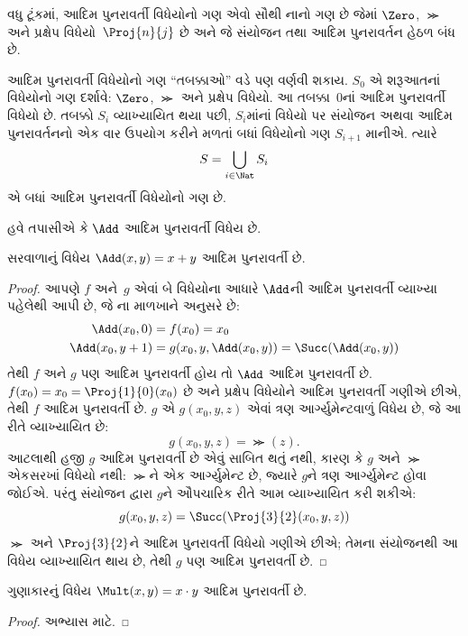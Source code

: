 \begin{explain}
વધુ ટૂંકમાં, આદિમ પુનરાવર્તી વિધેયોનો ગણ એવો સૌથી નાનો ગણ છે જેમાં
$\Zero$, $\Succ$ અને પ્રક્ષેપ વિધેયો~$\Proj{n}{j}$ છે અને જે
સંયોજન તથા આદિમ પુનરાવર્તન હેઠળ બંધ છે.

આદિમ પુનરાવર્તી વિધેયોનો ગણ ``તબક્કાઓ'' વડે પણ વર્ણવી શકાય. $S_0$
એ શરૂઆતનાં વિધેયોનો ગણ દર્શાવે: $\Zero$, $\Succ$ અને પ્રક્ષેપ
વિધેયો. આ તબક્કા~$0$નાં આદિમ પુનરાવર્તી વિધેયો છે. તબક્કો $S_i$
વ્યાખ્યાયિત થયા પછી, $S_i$માંનાં વિધેયો પર સંયોજન અથવા આદિમ
પુનરાવર્તનનો એક વાર ઉપયોગ કરીને મળતાં બધાં વિધેયોનો ગણ $S_{i+1}$
માનીએ. ત્યારે
\[
S = \bigcup_{i \in \Nat} S_i
\]
એ બધાં આદિમ પુનરાવર્તી વિધેયોનો ગણ છે.
\end{explain}

હવે તપાસીએ કે $\Add$ આદિમ પુનરાવર્તી વિધેય છે.

\begin{prop}
  સરવાળાનું વિધેય $\Add(x,y) = x+y$ આદિમ પુનરાવર્તી છે.
\end{prop}

\begin{proof}
આપણે $f$ અને~$g$ એવાં બે વિધેયોના આધારે $\Add$ની આદિમ પુનરાવર્તી
વ્યાખ્યા પહેલેથી આપી છે, જે ના
માળખાને અનુસરે છે:
\begin{align*}
  \Add(x_0, 0) & = f(x_0) = x_0\\
  \Add(x_0, y+1) & = g(x_0, y, \Add(x_0, y)) =
  \Succ(\Add(x_0, y))
\end{align*}
તેથી $f$ અને $g$ પણ આદિમ પુનરાવર્તી હોય તો $\Add$ આદિમ
પુનરાવર્તી છે. $f(x_0) = x_0 = \Proj{1}{0}(x_0)$ છે અને પ્રક્ષેપ
વિધેયોને આદિમ પુનરાવર્તી ગણીએ છીએ, તેથી $f$ આદિમ પુનરાવર્તી છે.
$g$ એ $g(x_0, y, z)$ એવાં ત્રણ આર્ગ્યુમેન્ટવાળું વિધેય છે, જે આ
રીતે વ્યાખ્યાયિત છે:
\[
g(x_0, y, z) = \Succ(z).
\]
આટલાથી હજી $g$ આદિમ પુનરાવર્તી છે એવું સાબિત થતું નથી, કારણ કે
$g$ અને $\Succ$ એકસરખાં વિધેયો નથી: $\Succ$ને એક આર્ગ્યુમેન્ટ છે,
જ્યારે $g$ને ત્રણ આર્ગ્યુમેન્ટ હોવા જોઈએ. પરંતુ સંયોજન દ્વારા
$g$ને ઔપચારિક રીતે આમ વ્યાખ્યાયિત કરી શકીએ:
\[
g(x_0, y, z) = \Succ(\Proj{3}{2}(x_0, y, z))
\]
$\Succ$ અને $\Proj{3}{2}$ને આદિમ પુનરાવર્તી વિધેયો ગણીએ છીએ;
તેમના સંયોજનથી આ વિધેય વ્યાખ્યાયિત થાય છે, તેથી $g$ પણ આદિમ
પુનરાવર્તી છે.
\end{proof}

\begin{prop}
  ગુણાકારનું વિધેય $\Mult(x,y) = x \cdot y$ આદિમ પુનરાવર્તી છે.
\end{prop}

\begin{proof}
  અભ્યાસ માટે.
\end{proof}

